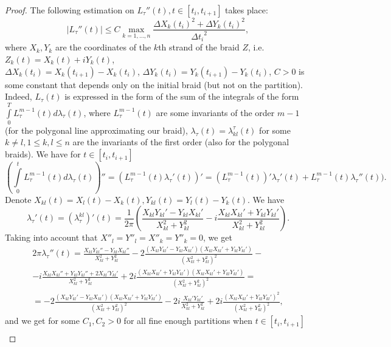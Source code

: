 \documentclass[12pt, a4paper, titlepage]{article}
\begin{document}
\begin{proof}
 The following estimation on $L_{\tau}''(t), t\in [t_i, t_{i+1}]$ takes place:
\begin{equation}\label{estimateLabel}
|L_{\tau}''(t)|\le C\max_{k=1,\dots, n}\frac{\Delta X_k(t_i)^2+\Delta Y_k(t_i)^2}{{\Delta t_i}^2},
\end{equation}
where $X_k, Y_k$ are the coordinates of the $k$th strand of the braid $Z$, i.e.
$Z_k(t) = X_k(t)+i Y_k(t)$, \\
$\Delta X_k(t_i)=X_k(t_{i+1})-X_k(t_i)$,
$\Delta Y_k(t_i)=Y_k(t_{i+1})-Y_k(t_i)$,
$C>0$ is some constant that depends only on the initial braid (but not on the
partition). 
 Indeed, $L_{\tau}(t)$ is expressed in the form of the sum of the integrals of the form
$\int\limits_0^T L_{\tau}^{m-1}(t)d\lambda_{\tau}(t)$, where $L_{\tau}^{m-1}(t)$ are some invariants
of the order $m-1$ (for the polygonal line approximating our braid), $\lambda_{\tau}(t)=\lambda_{kl}^{\tau}(t)$
for some $k\ne l, 1\le k,l \le n$ are the invariants of the first order (also for the polygonal braids).
 We have for $t\in [t_i, t_{i+1}]$
\begin{equation} \label{derivativeEstimation}
 \left(\int\limits_{0}^{t} L_{\tau}^{m-1}(t)d\lambda_{\tau}(t)\right)''=
(L_{\tau}^{m-1}(t)\lambda_{\tau}'(t))'=
(L_{\tau}^{m-1}(t))'\lambda_{\tau}'(t) + L_{\tau}^{m-1}(t)\lambda_{\tau}''(t)).
\end{equation}
 Denote $X_{kl}(t)=X_l(t)-X_k(t), Y_{kl}(t)=Y_l(t)-Y_k(t)$. We have
$$
\lambda_{\tau}'(t)=(\lambda_{\tau}^{kl})'(t)=
\frac{1}{2\pi}\left(\frac{X_{kl}Y_{kl}'-Y_{kl}X_{kl}'}{X_{kl}^2+Y_{kl}^2}-
i\frac{X_{kl}X_{kl}'+Y_{kl}Y_{kl}'}{X_{kl}^2+Y_{kl}^2}\right).
$$
Taking into account that $X''_l=Y''_l=X''_k=Y''_k=0$, we get
\begin{multline*}
2\pi \lambda_{\tau}''(t)=
\frac{X_{kl}Y_{kl}''-Y_{kl}X_{kl}''}{X_{kl}^2+Y_{kl}^2}-
2\frac{(X_{kl}Y_{kl}'-Y_{kl}X_{kl}')(X_{kl}X_{kl}'+Y_{kl}Y_{kl}')}
{(X_{kl}^2+Y_{kl}^2)^2}-\\
-i\frac{X_{kl}X_{kl}''+Y_{kl}Y_{kl}''+2X_{kl}'Y_{kl}'}{X_{kl}^2+Y_{kl}^2}+
2i\frac{(X_{kl}X_{kl}'+Y_{kl}Y_{kl}')(X_{kl}X_{kl}'+Y_{kl}Y_{kl}')}
{(X_{kl}^2+Y_{kl}^2)^2}=\\
=-2\frac{(X_{kl}Y_{kl}'-Y_{kl}X_{kl}')(X_{kl}X_{kl}'+Y_{kl}Y_{kl}')}
{(X_{kl}^2+Y_{kl}^2)^2}-
2i\frac{X_{kl}'Y_{kl}'}{X_{kl}^2+Y_{kl}^2}+2i\frac{(X_{kl}X_{kl}'+Y_{kl}Y_{kl}')^2}
{(X_{kl}^2+Y_{kl}^2)^2},
\end{multline*}
and we get for some $C_1, C_2>0$ for all fine enough partitions
when $t\in[t_i, t_{i+1}]$
\begin{multline*}

\end{multline*}
\end{proof}
\end{document}
